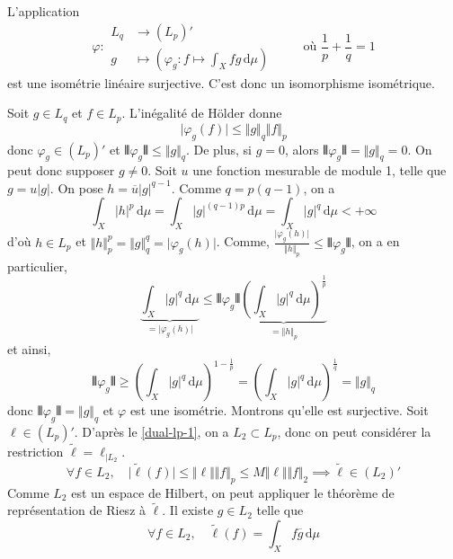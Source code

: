 	
	\begin{theorem}
		L'application
		\[
		\varphi :
		\begin{array}{ll}
			L_q &\rightarrow (L_p)' \\
			g &\mapsto \left( \varphi_g : f \mapsto \int_X f g \, \mathrm{d}\mu \right)
		\end{array}
		\qquad \text{ où } \frac{1}{p} + \frac{1}{q} = 1
		\]
		est une isométrie linéaire surjective. C'est donc un isomorphisme isométrique.
	\end{theorem}
	
	\begin{demonstration}
		Soit $g \in L_q$ et $f \in L_p$. L'inégalité de Hölder donne
		\[ \vert \varphi_g(f) \vert \leq \Vert g \Vert_q \Vert f \Vert_p \]
		donc $\varphi_g \in (L_p)'$ et $\VERT \varphi_g \VERT \leq \Vert g \Vert_q$. De plus, si $g = 0$, alors $\VERT \varphi_g \VERT = \Vert g \Vert_q = 0$. On peut donc supposer $g \neq 0$.
		\newpar
	 	Soit $u$ une fonction mesurable de module 1, telle que $g = u \vert g \vert$. On pose $h = \overline{u} \vert g \vert^{q-1}$. Comme $q = p(q-1)$, on a
		\[ \int_X \vert h \vert^p \, \mathrm{d}\mu = \int_X \vert g \vert^{(q-1)p} \, \mathrm{d}\mu = \int_X \vert g \vert^{q} \, \mathrm{d}\mu < + \infty \]
		d'où $h \in L_p$ et $\Vert h \Vert_p^p = \Vert g \Vert_q^q = \vert \varphi_g(h) \vert$. Comme, $\frac{\vert \varphi_g(h) \vert}{\Vert h \Vert_p} \leq \VERT \varphi_g \VERT$, on a en particulier,
		\[ \underbrace{\int_X \vert g \vert^{q} \, \mathrm{d}\mu}_{= \vert \varphi_g(h) \vert} \leq \VERT \varphi_g \VERT \underbrace{\left ( \int_X \vert g \vert^{q} \, \mathrm{d}\mu \right )^{\frac{1}{p}}}_{= \Vert h \Vert_p} \]
		et ainsi,
		\[ \VERT \varphi_g \VERT \geq \left ( \int_X \vert g \vert^{q} \, \mathrm{d}\mu \right )^{1 - \frac{1}{p}} = \left ( \int_X \vert g \vert^{q} \, \mathrm{d}\mu \right )^{\frac{1}{q}} = \Vert g \Vert_q \]
		donc $\VERT \varphi_g \VERT = \Vert g \Vert_q$ et $\varphi$ est une isométrie.
		\newpar
		Montrons qu'elle est surjective. Soit $\ell \in (L_p)'$. D'après le \cref{dual-lp-1}, on a $L_2 \subset L_p$, donc on peut considérer la restriction $\widetilde{\ell} = \ell_{| L_2}$.
		\[ \forall f \in L_2, \quad \vert \widetilde{\ell}(f) \vert \leq \Vert \ell \Vert \Vert f \Vert_p \leq M \Vert \ell \Vert \Vert f \Vert_2 \implies \widetilde{\ell} \in (L_2)' \]
		Comme $L_2$ est un espace de Hilbert, on peut appliquer le théorème de représentation de Riesz à $\widetilde{\ell}$. Il existe $g \in L_2$ telle que
		\[ \forall f \in L_2, \quad \widetilde{\ell}(f) = \int_X f \overline{g} \, \mathrm{d}\mu \]

\end{demonstration}

